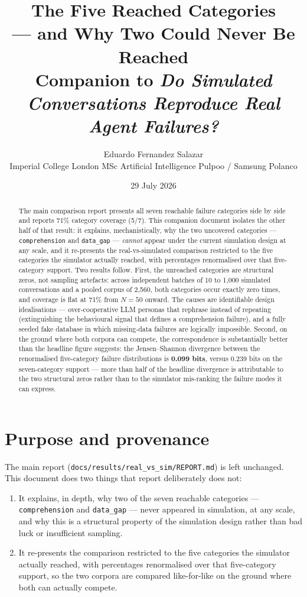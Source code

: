 \documentclass[11pt,a4paper]{article}
\title{\textbf{The Five Reached Categories}\\
\large --- and Why Two Could Never Be Reached\\[2pt]
\normalsize Companion to \emph{Do Simulated Conversations Reproduce Real Agent Failures?}}
\author{Eduardo Fernandez Salazar\\
\small Imperial College London \;\textperiodcentered\; MSc Artificial Intelligence \;\textperiodcentered\; Pulpoo / Samsung Polanco}
\date{29 July 2026}
\newcommand{\cat}[1]{\texttt{#1}}
\begin{document}
\maketitle

\begin{abstract}
\noindent
The main comparison report presents all seven reachable failure categories side by side and reports
71\% category coverage (5/7). This companion document isolates the other half of that result: it
explains, mechanistically, why the two uncovered categories --- \cat{comprehension} and
\cat{data\_gap} --- \emph{cannot} appear under the current simulation design at any scale, and it
re-presents the real-vs-simulated comparison restricted to the five categories the simulator
actually reached, with percentages renormalised over that five-category support. Two results
follow. First, the unreached categories are structural zeros, not sampling artefacts: across
independent batches of 10 to 1{,}000 simulated conversations and a pooled corpus of 2{,}560, both
categories occur exactly zero times, and coverage is flat at 71\% from $N{=}50$ onward. The causes
are identifiable design idealisations --- over-cooperative LLM personas that rephrase instead of
repeating (extinguishing the behavioural signal that defines a comprehension failure), and a fully
seeded fake database in which missing-data failures are logically impossible. Second, on the ground
where both corpora can compete, the correspondence is substantially better than the headline
figure suggests: the Jensen--Shannon divergence between the renormalised five-category failure
distributions is \textbf{0.099 bits}, versus 0.239 bits on the seven-category support --- more than
half of the headline divergence is attributable to the two structural zeros rather than to the
simulator mis-ranking the failure modes it can express.
\end{abstract}

\section{Purpose and provenance}

The main report (\texttt{docs/results/real\_vs\_sim/REPORT.md}) is left unchanged. This document
does two things that report deliberately does not:

\begin{enumerate}[nosep]
  \item It explains, in depth, why two of the seven reachable categories ---
        \cat{comprehension} and \cat{data\_gap} --- never appeared in simulation, at any scale,
        and why this is a structural property of the simulation design rather than bad luck or
        insufficient sampling.
  \item It re-presents the comparison restricted to the five categories the simulator actually
        reached, with percentages renormalised over that five-category support, so the two corpora
        are compared like-for-like on the ground where both can actually compete.
\end{enumerate}
\end{document}
